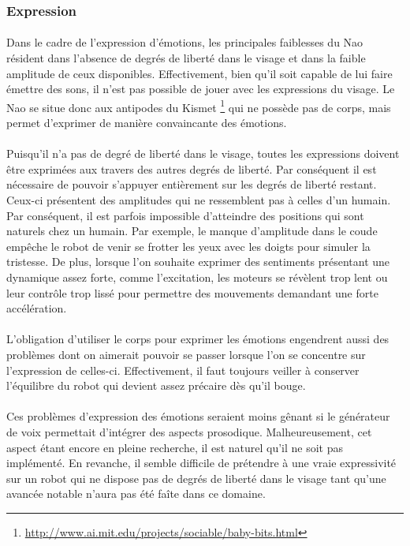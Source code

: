 \subsubsection{Expression}
\paragraph{}
Dans le cadre de l'expression d'émotions, les principales faiblesses du Nao
résident dans l'absence de degrés de liberté dans le visage et
dans la faible amplitude de ceux disponibles. Effectivement, bien qu'il soit
capable de lui faire émettre des sons, il n'est pas possible de jouer avec 
les expressions du visage. Le Nao se situe donc aux antipodes du Kismet
\footnote{\url{http://www.ai.mit.edu/projects/sociable/baby-bits.html}} qui
ne possède pas de corps, mais permet d'exprimer de manière convaincante des
émotions.

\paragraph{}
Puisqu'il n'a pas de degré de liberté dans le visage, toutes les expressions
doivent être exprimées aux travers des autres degrés de liberté. Par
conséquent il est nécessaire de pouvoir s'appuyer entièrement sur les degrés
de liberté restant. Ceux-ci présentent des amplitudes qui ne ressemblent pas
à celles d'un humain. Par conséquent, il est parfois impossible d'atteindre
des positions qui sont naturels chez un humain. Par exemple, le manque
d'amplitude dans le coude empêche le robot de venir se frotter les yeux avec
les doigts pour simuler la tristesse. De plus, lorsque l'on souhaite
exprimer des sentiments présentant une dynamique assez forte, comme
l'excitation, les moteurs se révèlent trop lent ou leur contrôle trop lissé
pour permettre des mouvements demandant une forte accélération.

\paragraph{}
L'obligation d'utiliser le corps pour exprimer les émotions engendrent aussi
des problèmes dont on aimerait pouvoir se passer lorsque l'on se concentre
sur l'expression de celles-ci. Effectivement, il faut toujours veiller à
conserver l'équilibre du robot qui devient assez précaire dès qu'il bouge.

\paragraph{}
Ces problèmes d'expression des émotions seraient moins gênant si le
générateur de voix permettait d'intégrer des aspects prosodique.
Malheureusement, cet aspect étant encore en pleine recherche, il est naturel
qu'il ne soit pas implémenté. En revanche, il semble difficile de prétendre
à une vraie expressivité sur un robot qui ne dispose pas de degrés de
liberté dans le visage tant qu'une avancée notable n'aura pas été faîte
dans ce domaine.


